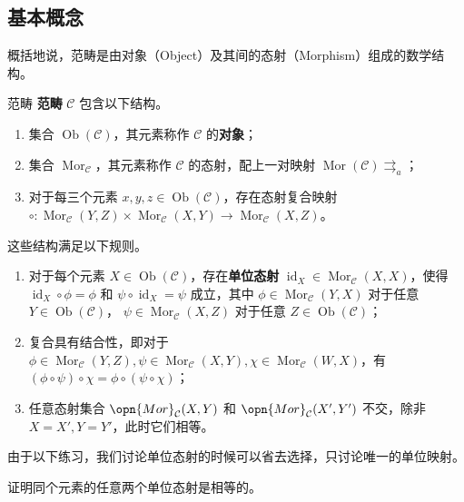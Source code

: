 
\begin{issues}
\issueMissDepend
\issueNeedCite
\issueAbstract
\end{issues}

\subsection{基本概念}
概括地说，范畴是由对象（Object）及其间的态射（Morphism）组成的数学结构。
\begin{definition}{范畴}
\textbf{范畴} $\mathcal{C}$ 包含以下结构。
\begin{enumerate}
    \item 集合 $\operatorname{Ob}(\mathcal{C})$，其元素称作 $\mathcal{C}$ 的\textbf{对象}；
    \item 集合 $\operatorname{Mor}_{\mathcal{C}}$，其元素称作 $\mathcal{C}$ 的态射，配上一对映射 $\operatorname{Mor}(\mathcal{C})\rightrightarrows_{a}$；
    \item 对于每三个元素 $x,y,z\in\operatorname{Ob}(\mathcal{C})$，存在态射复合映射 ${\circ}:\operatorname{Mor}_\mathcal{C}(Y,Z)\times\operatorname{Mor}_{\mathcal{C}}(X,Y)\to\operatorname{Mor}_\mathcal{C}(X,Z)$。
\end{enumerate}
这些结构满足以下规则。
\begin{enumerate}
    \item 对于每个元素 $X\in\operatorname{Ob}(\mathcal{C})$，存在\textbf{单位态射} $\operatorname{id}_X\in\operatorname{Mor}_\mathcal{C}(X,X)$，使得 $\operatorname{id}_X\circ\phi=\phi$ 和 $\psi\circ\operatorname{id}_X=\psi$ 成立，其中 $\phi\in\operatorname{Mor}_\mathcal{C}(Y,X)$ 对于任意 $Y\in\operatorname{Ob}(\mathcal{C})$， $\psi\in\operatorname{Mor}_\mathcal{C}(X,Z)$ 对于任意 $Z\in\operatorname{Ob}(\mathcal{C})$；
    \item 复合具有结合性，即对于 $\phi\in\operatorname{Mor}_\mathcal{C}(Y,Z),\psi\in\operatorname{Mor}_\mathcal{C}(X,Y),\chi\in\operatorname{Mor}_\mathcal{C}(W,X)$，有 $(\phi\circ\psi)\circ\chi=\phi\circ(\psi\circ\chi)$；
    \item 任意态射集合 $\opn{Mor}_\mathcal{C}(X,Y)$ 和 $\opn{Mor}_\mathcal{C}(X',Y')$ 不交，除非 $X=X',Y=Y'$，此时它们相等。
\end{enumerate}
\end{definition}
由于以下练习，我们讨论单位态射的时候可以省去选择，只讨论唯一的单位映射。
\begin{exercise}{}
证明同个元素的任意两个单位态射是相等的。
\end{exercise}
